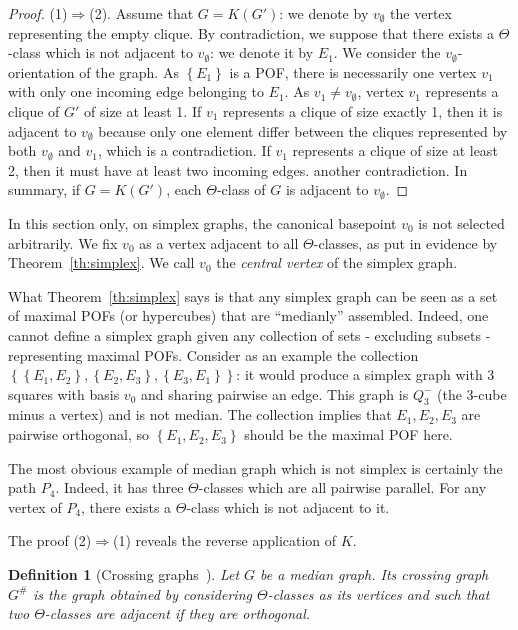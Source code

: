 \documentclass{article}
\newtheorem{definition}{Definition}
\newcommand{\set}[1]{\left\{ #1 \right\}}
\begin{document}
\begin{proof}
(1)$\Rightarrow$(2). Assume that $G=K(G')$: we denote by $v_{\emptyset}$ the vertex representing the empty clique. By contradiction, we suppose that there exists a $\Theta$-class which is not adjacent to $v_{\emptyset}$: we denote it by $E_1$. We consider the $v_{\emptyset}$-orientation of the graph. As $\set{E_1}$ is a POF, there is necessarily one vertex $v_1$ with only one incoming edge belonging to $E_1$. As $v_1 \neq v_{\emptyset}$, vertex $v_1$ represents a clique of $G'$ of size at least 1. If $v_1$ represents a clique of size exactly 1, then it is adjacent to $v_{\emptyset}$ because only one element differ between the cliques represented by both $v_{\emptyset}$ and $v_1$, which is a contradiction. If $v_1$ represents a clique of size at least 2, then it must have at least two incoming edges. another contradiction. In summary, if $G=K(G')$, each $\Theta$-class of $G$ is adjacent to $v_{\emptyset}$.
\end{proof}

In this section only, on simplex graphs, the canonical basepoint $v_0$ is not selected arbitrarily. We fix $v_0$ as a vertex adjacent to all $\Theta$-classes, as put in evidence by Theorem~\ref{th:simplex}. We call $v_0$ the \textit{central vertex} of the simplex graph.

What Theorem~\ref{th:simplex} says is that any simplex graph can be seen as a set of maximal POFs (or hypercubes) that are ``medianly'' assembled. Indeed, one cannot define a simplex graph given any collection of sets - excluding subsets - representing maximal POFs. Consider as an example the collection $\set{\set{E_1,E_2},\set{E_2,E_3},\set{E_3,E_1}}$: it would produce a simplex graph with 3 squares with basis $v_0$ and sharing pairwise an edge. This graph is $Q_3^-$ (the 3-cube minus a vertex) and is not median. The collection implies that $E_1,E_2,E_3$ are pairwise orthogonal, so $\set{E_1,E_2,E_3}$ should be the maximal POF here.

The most obvious example of median graph which is not simplex is certainly the path $P_4$. Indeed, it has three $\Theta$-classes which are all pairwise parallel. For any vertex of $P_4$, there exists a $\Theta$-class which is not adjacent to it.

The proof (2)$\Rightarrow$(1) reveals the reverse application of $K$. 

\begin{definition}[Crossing graphs~\cite{KlKo09,KlMu02}]
Let $G$ be a median graph. Its \textit{crossing graph} $G^{\#}$ is the graph obtained by considering $\Theta$-classes as its vertices and such that two $\Theta$-classes are adjacent if they are orthogonal.
\label{def:crossing}
\end{definition}
\end{document}
